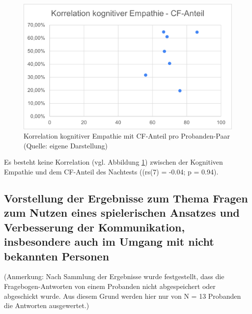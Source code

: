 \begin{figure}[ht]
\centering
\includegraphics[width=1\linewidth]{content/pictures/Korrelation_Kognitive_Empathie_cfh.png}
\caption{Korrelation kognitiver Empathie mit \ac{CF}-Anteil pro Probanden-Paar (Quelle: eigene Darstellung)}
\label{fig:correlation_kognitive_empathy_cfh}
\end{figure}

Es besteht keine Korrelation (vgl. Abbildung \ref{fig:correlation_kognitive_empathy_cfh}) zwischen der Kognitiven Empathie und dem \ac{CF}-Anteil des Nachtests ((rs(7) = -0.04; p = 0.94).



\subsection{Vorstellung der Ergebnisse zum Thema Fragen zum Nutzen eines spielerischen Ansatzes und Verbesserung der Kommunikation, insbesondere auch im Umgang mit nicht bekannten Personen}
(Anmerkung: Nach Sammlung der Ergebnisse wurde festgestellt, dass die Fragebogen-Antworten von einem Probanden nicht abgespeichert oder abgeschickt wurde. Aus diesem Grund werden hier nur von N = 13 Probanden die Antworten ausgewertet.)

